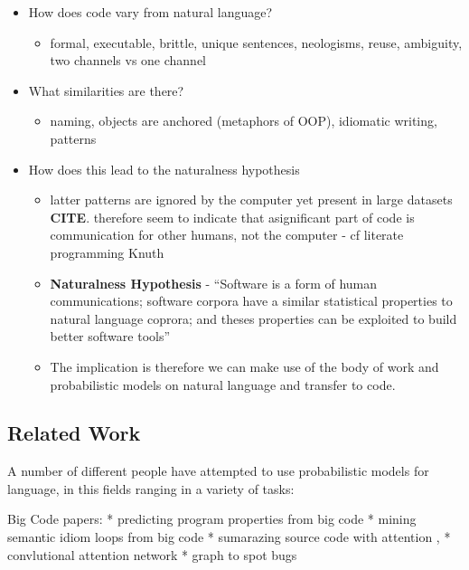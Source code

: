 \begin{itemize}
    \item How does code vary from natural language?
        \begin{itemize}
            \item formal, executable, brittle, unique sentences, neologisms, reuse, ambiguity, two channels vs one channel
        \end{itemize}
    \item What similarities are there?
        \begin{itemize}
            \item naming, objects are anchored (metaphors of OOP), idiomatic writing, patterns
        \end{itemize}
    \item How does this lead to the naturalness hypothesis
        \begin{itemize}
            \item latter patterns are ignored by the computer yet present in large datasets \textbf{CITE}. 
            therefore seem to indicate that asignificant part of code is communication for other humans, not the computer - cf literate programming Knuth
            \item \textbf{Naturalness Hypothesis} - ``Software is a form of human communications; software corpora have a similar statistical properties to natural language coprora; and theses properties can be exploited to build better software tools'' 
            \item The implication is therefore we can make use of the body of work and probabilistic models on natural language and transfer to code.
        \end{itemize}
\end{itemize}


\subsection{Related Work} %
\label{ssub:related work}

A number of different people have attempted to use probabilistic models for language, in this fields ranging in a variety of tasks:

Big Code papers:
* predicting program properties from big code
* mining semantic idiom loops from big code
* sumarazing source code with attention ,
* convlutional attention network
* graph to spot bugs

